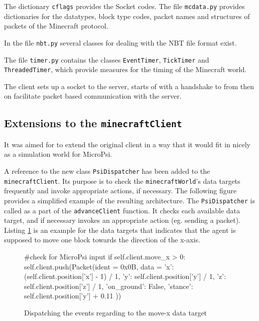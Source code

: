 The dictionary \texttt{cflags} provides the Socket codes.
The file \texttt{mcdata.py} provides dictionaries for the datatypes, block type codes, packet names and structures of packets of the Minecraft protocol.

In the file \texttt{nbt.py} several classes for dealing with the NBT file format exist.

The file \texttt{timer.py} contains the classes \texttt{EventTimer}, \texttt{TickTimer} and \texttt{ThreadedTimer}, which provide measures for the timing of the Minecraft world.

The client sets up a socket to the server, starts of with a handshake to from then on facilitate packet based communication with the server.

        \subsection{Extensions to the \texttt{minecraftClient}}
It was aimed for to extend the original client in a way that it would fit in nicely as a simulation world for MicroPsi.
        
A reference to the new class \texttt{PsiDispatcher} has been added to the \texttt{minecraftClient}. Its purpose is to check the \texttt{minecraftWorld}'s data targets frequently and invoke appropriate actions, if necessary. The following figure provides a simplified example of the resulting architecture. The \texttt{PsiDispatcher} is called as a part of the \texttt{advanceClient} function. It checks each available data target, and if necessary invokes an appropriate action (eg. sending a packet). Listing \ref{listing_dispatch} is an example for the data targets that indicates that the agent is supposed to move one block towards the direction of the x-axis. %

		\begin{figure}[ht]
			\centering
			\begin{minipage}{11cm}
				\begin{pseudocode}
#check for MicroPsi input
if self.client.move_x > 0:
    self.client.push(Packet(ident = 0x0B, data = {
        'x': (self.client.position['x'] - 1) / 1,
        'y': self.client.position['y'] / 1,
        'z': self.client.position['z'] / 1,
        'on_ground': False,
        'stance': self.client.position['y'] + 0.11
        }))
					\end{pseudocode}
				\caption{Dispatching the events regarding to the move-x data target}
				\label{listing_dispatch}
			\end{minipage}
		\end{figure}

